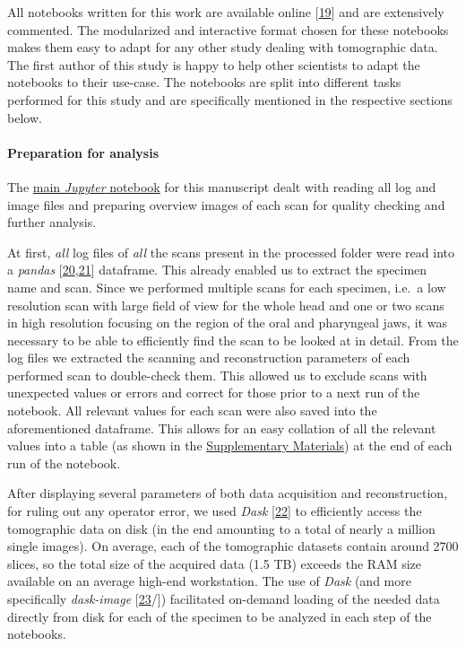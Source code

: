 All notebooks written for this work are available online {[}\protect\hyperlink{ref-1HteOscVd}{19}{]} and are extensively commented.
The modularized and interactive format chosen for these notebooks makes them easy to adapt for any other study dealing with tomographic data.
The first author of this study is happy to help other scientists to adapt the notebooks to their use-case.
The notebooks are split into different tasks performed for this study and are specifically mentioned in the respective sections below.

\hypertarget{preparation-for-analysis}{%
\paragraph{Preparation for analysis}\label{preparation-for-analysis}}

The \href{https://github.com/habi/EAWAG/blob/master/DisplayFishes.ipynb}{main \emph{Jupyter} notebook} for this manuscript dealt with reading all log and image files and preparing overview images of each scan for quality checking and further analysis.

At first, \emph{all} log files of \emph{all} the scans present in the processed folder were read into a \emph{pandas} {[}\protect\hyperlink{ref-19qQOHlFN}{20},\protect\hyperlink{ref-U5AcoDOX}{21}{]} dataframe.
This already enabled us to extract the specimen name and scan.
Since we performed multiple scans for each specimen, i.e.~a low resolution scan with large field of view for the whole head and one or two scans in high resolution focusing on the region of the oral and pharyngeal jaws, it was necessary to be able to efficiently find the scan to be looked at in detail.
From the log files we extracted the scanning and reconstruction parameters of each performed scan to double-check them.
This allowed us to exclude scans with unexpected values or errors and correct for those prior to a next run of the notebook.
All relevant values for each scan were also saved into the aforementioned dataframe.
This allows for an easy collation of all the relevant values into a table (as shown in the \protect\hyperlink{supplementary-materials}{Supplementary Materials}) at the end of each run of the notebook.

After displaying several parameters of both data acquisition and reconstruction, for ruling out any operator error, we used \emph{Dask} {[}\protect\hyperlink{ref-hj1CnyWB}{22}{]} to efficiently access the tomographic data on disk (in the end amounting to a total of nearly a million single images).
On average, each of the tomographic datasets contain around 2700 slices, so the total size of the acquired data (1.5 TB) exceeds the RAM size available on an average high-end workstation.
The use of \emph{Dask} (and more specifically \emph{dask-image} {[}\protect\hyperlink{ref-wIfTDBqd}{23}/{]}) facilitated on-demand loading of the needed data directly from disk for each of the specimen to be analyzed in each step of the notebooks.

